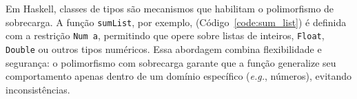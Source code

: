 Em Haskell, classes de tipos são mecanismos que habilitam o polimorfismo de sobrecarga. 
A função \texttt{sumList}, por exemplo, (Código~\ref{code:sum_list}) é definida com a restrição \texttt{Num a}, permitindo que opere sobre listas de inteiros, \texttt{Float}, \texttt{Double} ou outros tipos numéricos. 
Essa abordagem combina flexibilidade e segurança: o polimorfismo com sobrecarga garante que a função generalize seu comportamento apenas dentro de um domínio específico (\textit{e.g.}, números), evitando inconsistências. 


